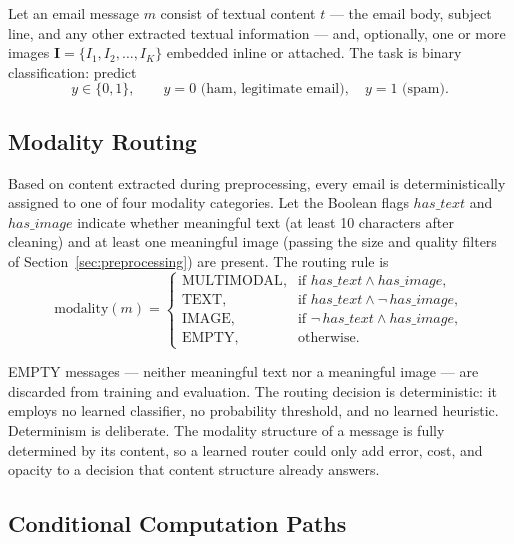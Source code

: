 \documentclass[10pt,twoside]{article}
\begin{document}
Let an email message $m$ consist of textual content $t$ --- the email body, subject line, and any other extracted textual information --- and, optionally, one or more images $\mathbf{I} = \{I_1, I_2, \ldots, I_K\}$ embedded inline or attached. The task is binary classification: predict
\begin{equation}\label{eq:task}
y \in \{0, 1\}, \qquad y = 0 \text{ (ham, legitimate email)}, \quad y = 1 \text{ (spam)}.
\end{equation}

\subsection{Modality Routing}\label{sec:routing}

Based on content extracted during preprocessing, every email is deterministically assigned to one of four modality categories. Let the Boolean flags $\mathit{has\_text}$ and $\mathit{has\_image}$ indicate whether meaningful text (at least 10 characters after cleaning) and at least one meaningful image (passing the size and quality filters of Section~\ref{sec:preprocessing}) are present. The routing rule is
\begin{equation}\label{eq:routing}
\text{modality}(m) = \begin{cases} \text{MULTIMODAL}, & \text{if } \mathit{has\_text} \wedge \mathit{has\_image}, \\ \text{TEXT}, & \text{if } \mathit{has\_text} \wedge \neg\,\mathit{has\_image}, \\ \text{IMAGE}, & \text{if } \neg\,\mathit{has\_text} \wedge \mathit{has\_image}, \\ \text{EMPTY}, & \text{otherwise.} \end{cases}
\end{equation}

EMPTY messages --- neither meaningful text nor a meaningful image --- are discarded from training and evaluation. The routing decision is deterministic: it employs no learned classifier, no probability threshold, and no learned heuristic. Determinism is deliberate. The modality structure of a message is fully determined by its content, so a learned router could only add error, cost, and opacity to a decision that content structure already answers.

\subsection{Conditional Computation Paths}\label{sec:paths}
\end{document}
